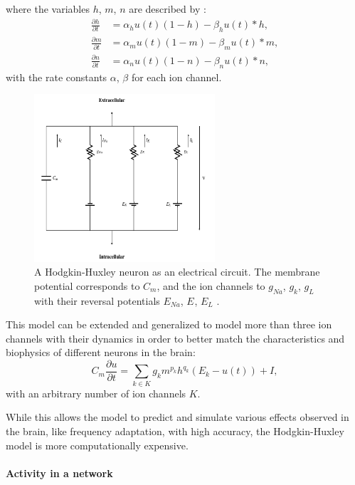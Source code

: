 where the variables $h$, $m$, $n$  are described by :
\[
\begin{split}
	\frac{\partial h}{\partial t} &= \alpha_h u(t) (1-h) - \beta_h u(t) * h , \\
	\frac{\partial m}{\partial t} &= \alpha_m u(t) (1-m) - \beta_m u(t) * m , \\
	\frac{\partial n}{\partial t} &= \alpha_n u(t) (1-n) - \beta_n u(t) * n ,
\end{split}
\]
with the rate constants $\alpha$, $\beta$ for each ion channel.

\begin{figure}
	\centering
    	\includegraphics[width=0.6\textwidth]{imgs/hode_hux.png} 
    \caption[A Hodgkin-Huxley neuron as an electrical circuit.]{A Hodgkin-Huxley neuron as an electrical circuit. The membrane potential corresponds to $C_m$, and the ion channels to $g_{Na}$, $g_{k}$, $g_{L}$ with their reversal potentials $E_{Na}$, $E_{}$, $E_{L}$ \cite{heikoMA}.}
	\label{fig:hogdehux}
\end{figure}

This model can be extended and generalized to model more than three ion channels with their dynamics in order to better match the characteristics and biophysics of different neurons in the brain:
\[
C_m \frac{\partial u}{\partial t} = \sum_{k \in K} g_k m^{p_k} h^{q_k} (E_k - u(t)) + I,
\]
with an arbitrary number of ion channels $K$.

While this allows the model to predict and simulate various effects observed in the brain, like frequency adaptation, with high accuracy, the Hodgkin-Huxley model is more computationally expensive.

\paragraph{Activity in a network} \label{c:poissonspikes}


